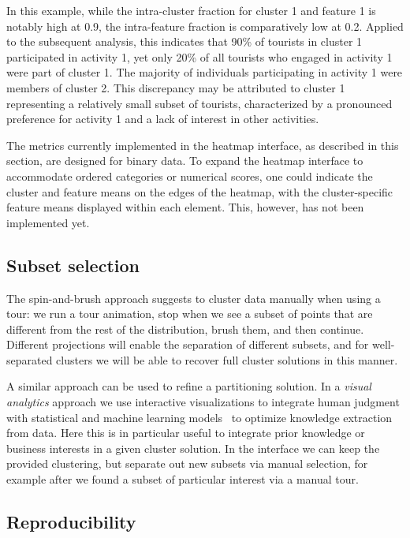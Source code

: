 \documentclass[article]{ajs}
\begin{document}
In this example, while the intra-cluster fraction for cluster 1 and feature 1 is notably high at 0.9, the intra-feature fraction is comparatively low at 0.2. Applied to the subsequent analysis, this indicates that 90\% of tourists in cluster 1 participated in activity 1, yet only 20\% of all tourists who engaged in activity 1 were part of cluster 1. The majority of individuals participating in activity 1 were members of cluster 2. This discrepancy may be attributed to cluster 1 representing a relatively small subset of tourists, characterized by a pronounced preference for activity 1 and a lack of interest in other activities.

The metrics currently implemented in the heatmap interface, as described in this section, are designed for binary data. To expand the heatmap interface to accommodate ordered categories or numerical scores, one could indicate the cluster and feature means on the edges of the heatmap, with the cluster-specific feature means displayed within each element. This, however, has not been implemented yet.

\subsection{Subset selection}

The spin-and-brush approach suggests to cluster data manually when using a tour: we run a tour animation, stop when we see a subset of points that are different from the rest of the distribution, brush them, and then continue. Different projections will enable the separation of different subsets, and for well-separated clusters we will be able to recover full cluster solutions in this manner.

A similar approach can be used to refine a partitioning solution. In a \textit{visual analytics} approach we use interactive visualizations to integrate human judgment with statistical and machine learning models~\citep{keim2010mastering} to optimize knowledge extraction from data.
Here this is in particular useful to integrate prior knowledge or business interests in a given cluster solution. In the interface we can keep the provided clustering, but separate out new subsets via manual selection, for example after we found a subset of particular interest via a manual tour.

\subsection{Reproducibility}
\end{document}
